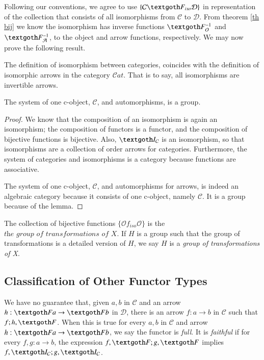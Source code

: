 \documentclass [12pt]{book}
\begin{document}
Following our conventions, we agree to use $\{\mathcal C\textgoth F_{iso}\mathcal D\}$ in representation of the collection that consists of all isomorphisms from $\mathcal C$ to $\mathcal D$. From theorem \ref{th bij} we know the isomorphism has inverse functions $\textgoth F_{\mathcal O}^{-1}$ and $\textgoth F_{\mathcal A}^{-1}$, to the object and arrow functions, respectively. We may now prove the following result.

\begin{lemma iso}The definition of isomorphism between categories, coincides with the definition of isomorphic arrows in the category $\mathcal Cat$. That is to say, all isomorphisms are invertible arrows.\end{lemma iso}

\begin{theorem}The system of one c-object, $\mathcal C$, and automorphisms, is a group.\label{auto 1}\end{theorem}

\begin{proof}We know that the composition of an isomorphism is again an isomorphism; the composition of functors is a functor, and the composition of bijective functions is bijective. Also, $\textgoth I_\mathcal C$ is an isomorphism, so that isomorphisms are a collection of order arrows for categories. Furthermore, the system of categories and isomorphisms is a category because functions are associative.

The system of one c-object, $\mathcal C$, and automorphisms for arrows, is indeed  an algebraic category because it consists of one c-object, namely $\mathcal C$. It is a group because of the lemma.\end{proof}

\begin{corollary}The collection of bijective functions $\{\mathcal Of_{iso}\mathcal O\}$ is the $\textit{the group of transformations of X}$. If $H$ is a group such that the group of transformations is a detailed version of $H$, we say $H$ is a \textit{group of transformations of X}.\end{corollary}

		\subsection{Classification of Other Functor Types}

We have no guarantee that, given $a,b$ in $\mathcal C$ and an arrow $h:\textgoth Fa\rightarrow\textgoth Fb$ in $\mathcal D$, there is an arrow $f:a\rightarrow b$ in $\mathcal C$ such that $f;h,\textgoth F$. When this is true for every $a,b$ in $\mathcal C$ and arrow $h:\textgoth Fa\rightarrow\textgoth Fb$, we say the functor is \textit{full}. It is \textit{faithful} if for every $f,g:a\rightarrow b$, the expression $f,\textgoth F;g,\textgoth F$ implies $f,\textgoth I_{\mathcal{C}};g,\textgoth I_{\mathcal{C}}$.
\end{document}
